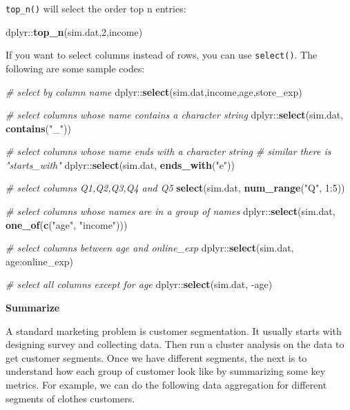 \documentclass[12pt,]{krantz}
\newenvironment{Shaded}{\begin{snugshade}}{\end{snugshade}}
\newcommand{\KeywordTok}[1]{\textcolor[rgb]{0.13,0.29,0.53}{\textbf{{#1}}}}
\newcommand{\DecValTok}[1]{\textcolor[rgb]{0.00,0.00,0.81}{{#1}}}
\newcommand{\StringTok}[1]{\textcolor[rgb]{0.31,0.60,0.02}{{#1}}}
\newcommand{\CommentTok}[1]{\textcolor[rgb]{0.56,0.35,0.01}{\textit{{#1}}}}
\newcommand{\NormalTok}[1]{{#1}}
\theoremstyle{definition}
\theoremstyle{definition}
\theoremstyle{remark}
\begin{document}
\texttt{top\_n()} will select the order top n entries:

\begin{Shaded}
\begin{Highlighting}[]
\NormalTok{dplyr::}\KeywordTok{top_n}\NormalTok{(sim.dat,}\DecValTok{2}\NormalTok{,income)}
\end{Highlighting}
\end{Shaded}

If you want to select columns instead of rows, you can use
\texttt{select()}. The following are some sample codes:

\begin{Shaded}
\begin{Highlighting}[]
\CommentTok{# select by column name}
\NormalTok{dplyr::}\KeywordTok{select}\NormalTok{(sim.dat,income,age,store_exp)}

\CommentTok{# select columns whose name contains a character string}
\NormalTok{dplyr::}\KeywordTok{select}\NormalTok{(sim.dat, }\KeywordTok{contains}\NormalTok{(}\StringTok{"_"}\NormalTok{))}

\CommentTok{# select columns whose name ends with a character string}
\CommentTok{# similar there is "starts_with"}
\NormalTok{dplyr::}\KeywordTok{select}\NormalTok{(sim.dat, }\KeywordTok{ends_with}\NormalTok{(}\StringTok{"e"}\NormalTok{))}

\CommentTok{# select columns Q1,Q2,Q3,Q4 and Q5}
\KeywordTok{select}\NormalTok{(sim.dat, }\KeywordTok{num_range}\NormalTok{(}\StringTok{"Q"}\NormalTok{, }\DecValTok{1}\NormalTok{:}\DecValTok{5}\NormalTok{)) }

\CommentTok{# select columns whose names are in a group of names}
\NormalTok{dplyr::}\KeywordTok{select}\NormalTok{(sim.dat, }\KeywordTok{one_of}\NormalTok{(}\KeywordTok{c}\NormalTok{(}\StringTok{"age"}\NormalTok{, }\StringTok{"income"}\NormalTok{)))}

\CommentTok{# select columns between age and online_exp}
\NormalTok{dplyr::}\KeywordTok{select}\NormalTok{(sim.dat, age:online_exp)}

\CommentTok{# select all columns except for age}
\NormalTok{dplyr::}\KeywordTok{select}\NormalTok{(sim.dat, -age)}
\end{Highlighting}
\end{Shaded}

\textbf{Summarize}

A standard marketing problem is customer segmentation. It usually starts
with designing survey and collecting data. Then run a cluster analysis
on the data to get customer segments. Once we have different segments,
the next is to understand how each group of customer look like by
summarizing some key metrics. For example, we can do the following data
aggregation for different segments of clothes customers.
\end{document}
